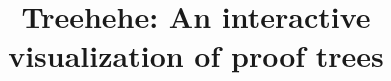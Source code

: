 \documentclass[conference]{IEEEtran}
\begin{document}
\title{Treehehe: An interactive visualization of proof trees
}

\author{
}


\maketitle

~\cite{infovis-ware}




\newcommand{\sentenceone}{Proofs are commonly illustrated as trees to make the structure of the argument salient.}
\end{document}

